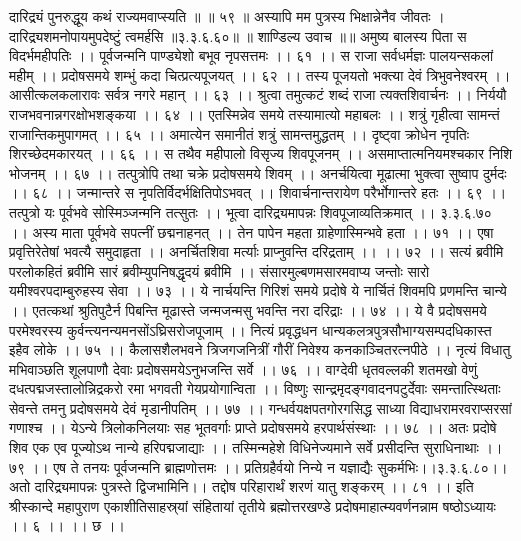 दारिद्र्यं पुनरुद्धूय कथं राज्यमवाप्स्यति ॥ ॥ ५९ ॥
अस्यापि मम पुत्रस्य भिक्षान्नेनैव जीवतः ।
दारिद्र्यशमनोपायमुपदेष्टुं त्वमर्हसि ॥३.३.६.६०॥
॥ शाण्डिल्य उवाच ॥॥
अमुष्य बालस्य पिता स विदर्भमहीपतिः ।।
पूर्वजन्मनि पाण्ड्येशो बभूव नृपसत्तमः ।। ६१ ।।
स राजा सर्वधर्मज्ञः पालयन्सकलां महीम् ।।
प्रदोषसमये शम्भुं कदा चित्प्रत्यपूजयत् ।। ६२ ।।
तस्य पूजयतो भक्त्या देवं त्रिभुवनेश्वरम् ।।
आसीत्कलकलारावः सर्वत्र नगरे महान् ।। ६३ ।।
श्रुत्वा तमुत्कटं शब्दं राजा त्यक्तशिवार्चनः ।।
निर्ययौ राजभवनान्नगरक्षोभशङ्कया ।। ६४ ।।
एतस्मिन्नेव समये तस्यामात्यो महाबलः ।।
शत्रुं गृहीत्वा सामन्तं राजान्तिकमुपागमत् ।। ६५ ।।
अमात्येन समानीतं शत्रुं सामन्तमुद्धतम् ।।
दृष्ट्वा क्रोधेन नृपतिः शिरच्छेदमकारयत् ।। ६६ ।।
स तथैव महीपालो विसृज्य शिवपूजनम् ।।
असमाप्तात्मनियमश्चकार निशि भोजनम् ।। ६७ ।।
तत्पुत्रोपि तथा चक्रे प्रदोषसमये शिवम् ।।
अनर्चयित्वा मूढात्मा भुक्त्वा सुष्वाप दुर्मदः ।। ६८ ।।
जन्मान्तरे स नृपतिर्विदर्भक्षितिपोऽभवत् ।।
शिवार्चनान्तरायेण परैर्भोगान्तरे हतः ।। ६९ ।।
तत्पुत्रो यः पूर्वभवे सोस्मिञ्जन्मनि तत्सुतः ।।
भूत्वा दारिद्र्यमापन्नः शिवपूजाव्यतिक्रमात् ।। ३.३.६.७० ।।
अस्य माता पूर्वभवे सपत्नीं छद्मनाहनत् ।।
तेन पापेन महता ग्राहेणास्मिन्भवे हता ।। ७१ ।।
एषा प्रवृत्तिरेतेषां भवत्यै समुदाहृता ।।
अनर्चितशिवा मर्त्याः प्राप्नुवन्ति दरिद्रताम् ।। ।। ७२ ।।
सत्यं ब्रवीमि परलोकहितं ब्रवीमि सारं ब्रवीम्युपनिषद्धृदयं ब्रवीमि ।।
संसारमुल्बणमसारमवाप्य जन्तोः सारो यमीश्वरपदाम्बुरुहस्य सेवा ।। ७३ ।।
ये नार्चयन्ति गिरिशं समये प्रदोषे ये नार्चितं शिवमपि प्रणमन्ति चान्ये ।।
एतत्कथां श्रुतिपुटैर्न पिबन्ति मूढास्ते जन्मजन्मसु भवन्ति नरा दरिद्राः ।। ७४ ।।
ये वै प्रदोषसमये परमेश्वरस्य कुर्वन्त्यनन्यमनसोंऽघ्रिसरोजपूजाम् ।।
नित्यं प्रवृद्धधन धान्यकलत्रपुत्रसौभाग्यसम्पदधिकास्त इहैव लोके ।। ७५ ।।
कैलासशैलभवने त्रिजगजनित्रीं गौरीं निवेश्य कनकाञ्चितरत्नपीठे ।।
नृत्यं विधातु मभिवाञ्छति शूलपाणौ देवाः प्रदोषसमयेऽनुभजन्ति सर्वे ।। ७६ ।।
वाग्देवी धृतवल्लकी शतमखो वेणुं दधत्पद्मजस्तालोन्निद्रकरो रमा भगवती गेयप्रयोगान्विता ।।
विष्णुः सान्द्रमृदङ्गवादनपटुर्देवाः समन्तात्स्थिताः सेवन्ते तमनु प्रदोषसमये देवं मृडानीपतिम् ।। ७७ ।।
गन्धर्वयक्षपतगोरगसिद्ध साध्या विद्याधरामरवराप्सरसां गणाश्च ।।
येऽन्ये त्रिलोकनिलयाः सह भूतवर्गाः प्राप्ते प्रदोषसमये हरपार्थसंस्थाः ।। ७८ ।।
अतः प्रदोषे शिव एक एव पूज्योऽथ नान्ये हरिपद्मजाद्याः ।।
तस्मिन्महेशे विधिनेज्यमाने सर्वे प्रसीदन्ति सुराधिनाथाः ।। ७९ ।।
एष ते तनयः पूर्वजन्मनि ब्राह्मणोत्तमः ।।
प्रतिग्रहैर्वयो निन्ये न यज्ञाद्यैः सुकर्मभिः।।३.३.६.८०।।
अतो दारिद्र्यमापन्नः पुत्रस्ते द्विजभामिनि।।
तद्दोष परिहारार्थं शरणं यातु शङ्करम् ।। ८१ ।।
इति श्रीस्कान्दे महापुराण एकाशीतिसाहस्र्यां संहितायां तृतीये ब्रह्मोत्तरखण्डे प्रदोषमाहात्म्यवर्णनन्नाम षष्ठोऽध्यायः ।। ६ ।। ।। छ ।।

